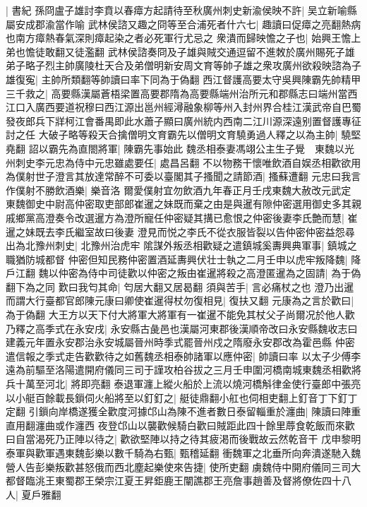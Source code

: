 |{
	書紀}
孫冏盧子雄討李賁以春瘴方起請待至秋廣州刺史新渝侯映不許|{
	吴立新喻縣屬安成郡渝當作喻}
武林侯諮又趣之冏等至合浦死者什六七|{
	趣讀曰促瘴之亮翻熱病也南方瘴熱春氣深則瘴起染之者必死軍行尤忌之}
衆潰而歸映憺之子也|{
	始興王憺上弟也憺徒敢翻又徒濫翻}
武林侯諮奏冏及子雄與賊交通逗留不進敇於廣州賜死子雄弟子略子烈主帥廣陵杜天合及弟僧明新安周文育等帥子雄之衆攻廣州欲殺映諮為子雄復寃|{
	主帥所類翻等帥讀曰率下同為于偽翻}
西江督護高要太守吳興陳霸先帥精甲三千救之|{
	高要縣漢屬蒼梧梁置高要郡隋為高要縣端州治所元和郡縣志曰端州當西江口入廣西要道祝穆曰西江源出邕州經潯融象柳等州入封州界合桂江漢武帝自巴蜀發夜郎兵下牂柯江會番禺即此水蕭子顯曰廣州統内西南二江川源深遠别置督護專征討之任}
大破子略等殺天合擒僧明文育霸先以僧明文育驍勇過人釋之以為主帥|{
	驍堅堯翻}
詔以霸先為直閤將軍|{
	陳霸先事始此}
魏丞相泰妻馮翊公主生子覺　東魏以光州刺史李元忠為侍中元忠雖處要任|{
	處昌呂翻}
不以物務干懷唯飲酒自娱丞相歡欲用為僕射世子澄言其放達常醉不可委以臺閣其子搔聞之請節酒|{
	搔蘇遭翻}
元忠曰我言作僕射不勝飲酒樂|{
	樂音洛}
爾愛僕射宜勿飲酒九年春正月壬戌東魏大赦改元武定　東魏御史中尉高仲密取吏部郎崔暹之妹既而棄之由是與暹有隙仲密選用御史多其親戚鄉黨高澄奏令改選暹方為澄所寵任仲密疑其搆已愈恨之仲密後妻李氏艶而慧|{
	崔暹之妹既去李氏繼室故曰後妻}
澄見而悦之李氏不從衣服皆裂以告仲密仲密益怨尋出為北豫州刺史|{
	北豫州治虎牢}
隂謀外叛丞相歡疑之遣鎮城奚夀興典軍事|{
	鎮城之職猶防城都督}
仲密但知民務仲密置酒延夀興伏壮士執之二月壬申以虎牢叛降魏|{
	降戶江翻}
魏以仲密為侍中司徒歡以仲密之叛由崔暹將殺之高澄匿暹為之固請|{
	為于偽翻下為之同}
歎曰我匄其命|{
	匄居大翻又居曷翻}
須與苦手|{
	言必痛杖之也}
澄乃出暹而謂大行臺都官郎陳元康曰卿使崔暹得杖勿復相見|{
	復扶又翻}
元康為之言於歡曰|{
	為于偽翻}
大王方以天下付大將軍大將軍有一崔暹不能免其杖父子尚爾况於他人歡乃釋之高季式在永安戌|{
	永安縣古彘邑也漢屬河東郡後漢順帝改曰永安縣魏收志曰建義元年置永安郡治永安城屬晉州時季式罷晉州戍之隋廢永安郡改為霍邑縣}
仲密遣信報之季式走告歡歡待之如舊魏丞相泰帥諸軍以應仲密|{
	帥讀曰率}
以太子少傅李遠為前驅至洛陽遣開府儀同三司于謹攻柏谷拔之三月壬申圍河橋南城東魏丞相歡將兵十萬至河北|{
	將即亮翻}
泰退軍瀍上縱火船於上流以燒河橋斛律金使行臺郎中張亮以小艇百餘載長鎻伺火船將至以釘釘之|{
	艇徒鼎翻小舡也伺相吏翻上釘音丁下釘丁定翻}
引鎻向岸橋遂獲全歡度河據邙山為陳不進者數日泰留輜重於瀍曲|{
	陳讀曰陣重直用翻瀍曲或作瀍西}
夜登邙山以襲歡候騎白歡曰賊距此四十餘里蓐食乾飯而來歡曰自當渴死乃正陣以待之|{
	歡欲堅陣以持之待其疲渇而後戰故云然乾音干}
戊申黎明泰軍與歡軍遇東魏彭樂以數千騎為右甄|{
	甄稽延翻}
衝魏軍之北垂所向奔潰遂馳入魏營人告彭樂叛歡甚怒俄而西北塵起樂使來告捷|{
	使所吏翻}
虜魏侍中開府儀同三司大都督臨洮王東蜀郡王榮宗江夏王昇鉅鹿王闡譙郡王亮詹事趙善及督將僚佐四十八人|{
	夏戶雅翻}
